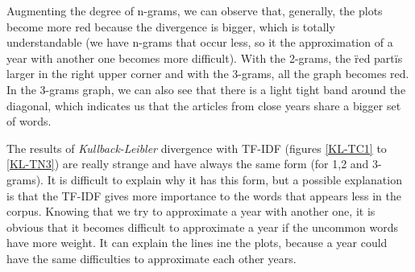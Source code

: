 Augmenting the degree of n-grams, we can observe that, generally, the plots become more red because the divergence is bigger, which is totally understandable (we have n-grams that occur less, so it the approximation of a year with another one becomes more difficult). With the 2-grams, the \"red part\" is larger in the right upper corner and with the 3-grams, all the graph becomes red. In the 3-grams graph, we can also see that there is a light tight band around the diagonal, which indicates us that the articles from close years share a bigger set of words.

The results of \emph{Kullback-Leibler} divergence with TF-IDF (figures \ref{KL-TC1} to \ref{KL-TN3}) are really strange and have always the same form (for 1,2 and 3-grams). It is difficult to explain why it has this form, but a possible explanation is that the TF-IDF gives more importance to the words that appears less in the corpus. Knowing that we try to approximate a year with another one, it is obvious that it becomes difficult to approximate a year if the uncommon words have more weight. It can explain the lines ine the plots, because a year could have the same difficulties to approximate each other years.